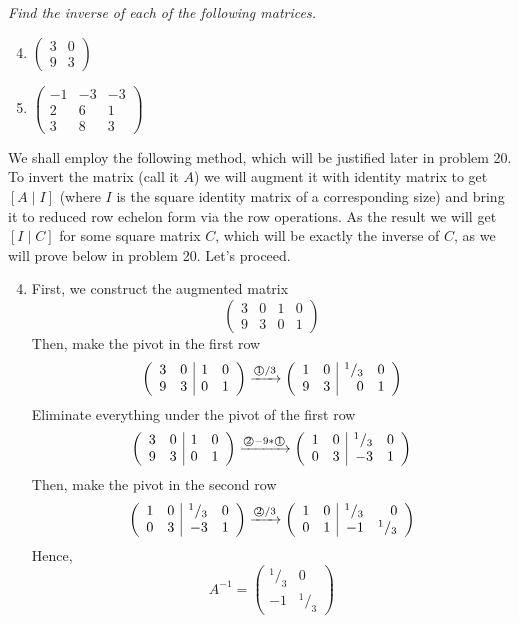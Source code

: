 \documentclass[8pt]{article} %
\newcommand{\myexplain}[3]{#1\xrightarrow{\text{#2}}#3}
\newcommand{\myfrac}[2]{^#1/_#2}
\begin{document}
\begin{description}
{		{\it Find the inverse of each of the following matrices.
		\begin{enumerate}[label=(\alph*)]
			\setcounter{enumi}{3}
			\renewcommand{\mymat}[1]{\left(\begin{array}{rr}#1\end{array}\right)}
			\item $\mymat{3&0\\9&3}$
			\setcounter{enumi}{6}
			\renewcommand{\mymat}[1]{\left(\begin{array}{rrr}#1\end{array}\right)}
			\item $\mymat{-1&-3&-3\\2&6&1\\3&8&3}$
		\end{enumerate}
			}
		We shall employ the following method, which will be justified later in problem 20. To invert the matrix (call it $A$) we
		will augment it with identity matrix to get $\left[A\mid I\right]$ (where $I$ is the square identity matrix of a
		corresponding size) and bring it to reduced row echelon form via the row operations. As the result we will get
		$\left[I\mid C\right]$ for some square matrix $C$, which will be exactly the inverse of $C$, as we will prove below in
		problem 20. Let's proceed.
		\begin{enumerate}[label=(\alph*)]
			\setcounter{enumi}{3}
			\renewcommand{\mymat}[1]{\left(\begin{array}{rr|rr}#1\end{array}\right)}
			\item First, we construct the augmented matrix
				\[\mymat{3&0&1&0\\9&3&0&1}\]
			Then, make the pivot in the first row
			\[\myexplain
				{\mymat{3&0&1&0\\9&3&0&1}}
				{\textcircled{1}$/3$}
				{\mymat{1&0&\myfrac{1}{3}&0\\9&3&0&1}}
			\]
			Eliminate everything under the pivot of the first row
			\[\myexplain
				{\mymat{3&0&1&0\\9&3&0&1}}
				{\textcircled{2}$-9*$\textcircled{1}}
				{\mymat{1&0&\myfrac{1}{3}&0\\0&3&-3&1}}
			\]
			Then, make the pivot in the second row
			\[\myexplain
				{\mymat{1&0&\myfrac{1}{3}&0\\0&3&-3&1}}
				{\textcircled{2}$/3$}
				{\mymat{1&0&\myfrac{1}{3}&0\\0&1&-1&\myfrac{1}{3}}}
			\]
			Hence, \[A^{-1}=\left(\begin{array}{rr}\myfrac{1}{3}&0\\-1&\myfrac{1}{3}\end{array}\right)\]

\end{enumerate}}
\end{description}
\end{document}
